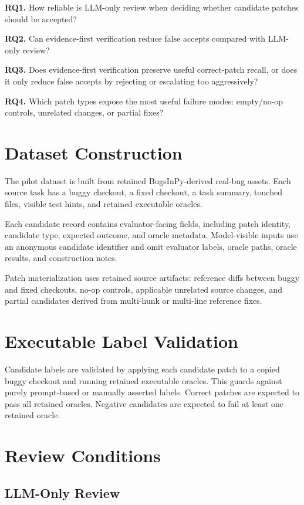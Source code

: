 \documentclass[conference]{IEEEtran}
\begin{document}
\textbf{RQ1.} How reliable is LLM-only review when deciding whether candidate
patches should be accepted?

\textbf{RQ2.} Can evidence-first verification reduce false accepts compared
with LLM-only review?

\textbf{RQ3.} Does evidence-first verification preserve useful correct-patch
recall, or does it only reduce false accepts by rejecting or escalating too
aggressively?

\textbf{RQ4.} Which patch types expose the most useful failure modes:
empty/no-op controls, unrelated changes, or partial fixes?

\section{Dataset Construction}

The pilot dataset is built from retained BugsInPy-derived real-bug assets. Each
source task has a buggy checkout, a fixed checkout, a task summary, touched
files, visible test hints, and retained executable oracles.

Each candidate record contains evaluator-facing fields, including patch
identity, candidate type, expected outcome, and oracle metadata. Model-visible
inputs use an anonymous candidate identifier and omit evaluator labels, oracle
paths, oracle results, and construction notes.

Patch materialization uses retained source artifacts: reference diffs between
buggy and fixed checkouts, no-op controls, applicable unrelated source changes,
and partial candidates derived from multi-hunk or multi-line reference fixes.

\section{Executable Label Validation}

Candidate labels are validated by applying each candidate patch to a copied
buggy checkout and running retained executable oracles. This guards against
purely prompt-based or manually asserted labels. Correct patches are expected
to pass all retained oracles. Negative candidates are expected to fail at least
one retained oracle.

\section{Review Conditions}

\subsection{LLM-Only Review}
\end{document}
